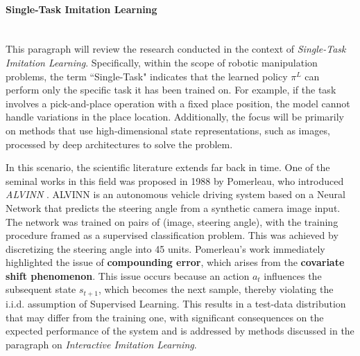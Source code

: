 \paragraph*{Single-Task Imitation Learning}\mbox{}\\
This paragraph will review the research conducted in the context of \textit{ Single-Task Imitation Learning}. Specifically, within the scope of robotic manipulation problems, the term ``Single-Task" indicates that the learned policy $\pi^{L}$ can perform only the specific task it has been trained on. For example, if the task involves a pick-and-place operation with a fixed place position, the model cannot handle variations in the place location. Additionally, the focus will be primarily on methods that use high-dimensional state representations, such as images, processed by deep architectures to solve the problem.

In this scenario, the scientific literature extends far back in time. One of the seminal works in this field was proposed in 1988 by Pomerleau, who introduced \textit{ALVINN} \cite{pomerleau1988alvinn}. ALVINN is an autonomous vehicle driving system based on a Neural Network that predicts the steering angle from a synthetic camera image input. The network was trained on pairs of (image, steering angle), with the training procedure framed as a supervised classification problem. This was achieved by discretizing the steering angle into 45 units. Pomerleau's work immediately highlighted the issue of \textbf{compounding error}, which arises from the \textbf{covariate shift phenomenon}. This issue occurs because an action $a_{t}$ influences the subsequent state $s_{t+1}$, which becomes the next sample, thereby violating the i.i.d. assumption of Supervised Learning. This results in a test-data distribution that may differ from the training one, with significant consequences on the expected performance of the system and is addressed by methods discussed in the paragraph on \textit{Interactive Imitation Learning}.

